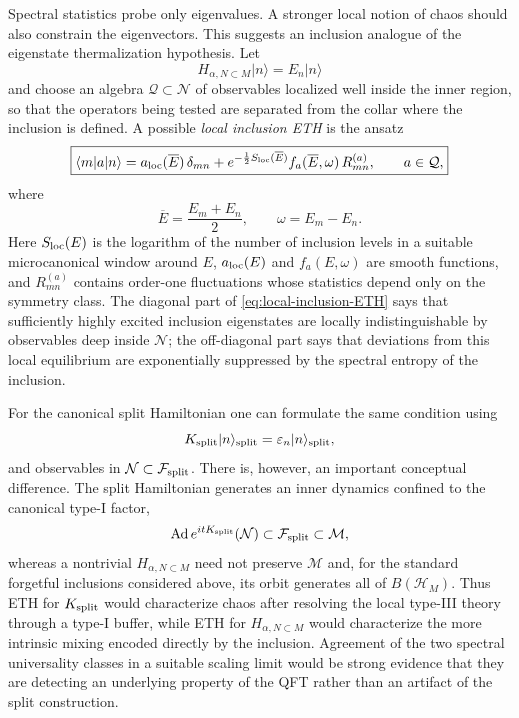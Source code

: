 \documentclass[a4paper,11pt]{article}
\theoremstyle{definition}
\newcommand{\Ad}{\operatorname{Ad}}
\begin{document}
Spectral statistics probe only eigenvalues.  A stronger local notion of chaos should also constrain the eigenvectors.  This suggests an inclusion analogue of the eigenstate thermalization hypothesis.  Let
\begin{equation}
    H_{\alpha,N\subset M}|n\rangle=E_n|n\rangle
\end{equation}
and choose an algebra $\mathcal Q\subset\mathcal N$ of observables localized well inside the inner region, so that the operators being tested are separated from the collar where the inclusion is defined.  A possible \emph{local inclusion ETH} is the ansatz
\begin{equation}
    \boxed{
    \langle m|a|n\rangle
    =
    a_{\rm loc}(\overline E)\,\delta_{mn}
    +
    e^{-\frac12 S_{\rm loc}(\overline E)}
    f_a(\overline E,\omega)\,
    R^{(a)}_{mn},
    \qquad
    a\in\mathcal Q ,
    }
    \label{eq:local-inclusion-ETH}
\end{equation}
where
\begin{equation}
    \overline E=\frac{E_m+E_n}{2},
    \qquad
    \omega=E_m-E_n.
\end{equation}
Here $S_{\rm loc}(E)$ is the logarithm of the number of inclusion levels in a suitable microcanonical window around $E$, $a_{\rm loc}(E)$ and $f_a(E,\omega)$ are smooth functions, and $R^{(a)}_{mn}$ contains order-one fluctuations whose statistics depend only on the symmetry class.  The diagonal part of \eqref{eq:local-inclusion-ETH} says that sufficiently highly excited inclusion eigenstates are locally indistinguishable by observables deep inside $\mathcal N$; the off-diagonal part says that deviations from this local equilibrium are exponentially suppressed by the spectral entropy of the inclusion.

For the canonical split Hamiltonian one can formulate the same condition using
\begin{equation}
    K_{\rm split}|n\rangle_{\rm split}
    =
    \varepsilon_n|n\rangle_{\rm split},
\end{equation}
and observables in $\mathcal N\subset\mathcal F_{\rm split}$.  There is, however, an important conceptual difference.  The split Hamiltonian generates an inner dynamics confined to the canonical type-I factor,
\begin{equation}
    \Ad e^{itK_{\rm split}}(\mathcal N)
    \subset\mathcal F_{\rm split}\subset\mathcal M,
\end{equation}
whereas a nontrivial $H_{\alpha,N\subset M}$ need not preserve $\mathcal M$ and, for the standard forgetful inclusions considered above, its orbit generates all of $B(\mathcal H_M)$.  Thus ETH for $K_{\rm split}$ would characterize chaos after resolving the local type-III theory through a type-I buffer, while ETH for $H_{\alpha,N\subset M}$ would characterize the more intrinsic mixing encoded directly by the inclusion.  Agreement of the two spectral universality classes in a suitable scaling limit would be strong evidence that they are detecting an underlying property of the QFT rather than an artifact of the split construction.
\end{document}
